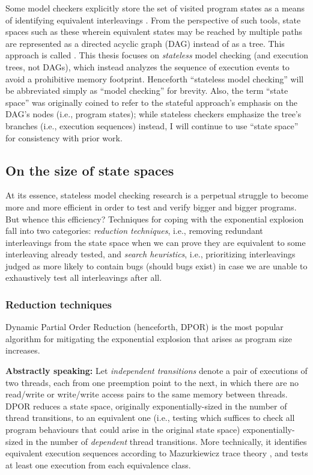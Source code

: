 Some model checkers explicitly store the set of visited program states as a means of identifying equivalent interleavings \cite{spin}.
From the perspective of such tools, state spaces such as these wherein equivalent states may be reached by multiple paths
are represented as a directed acyclic graph (DAG) instead of as a tree.
This approach is called .
This thesis focuses on {\em stateless} model checking (and execution trees, not DAGs),
which instead analyzes the sequence of execution events to avoid a prohibitive memory footprint.
Henceforth ``stateless model checking'' will be abbreviated simply as ``model checking'' for brevity.
Also, the term ``state space'' was originally coined to refer to the stateful approach's emphasis on the DAG's nodes
(i.e., program states);
while stateless checkers emphasize the tree's branches (i.e., execution sequences) instead,
I will continue to use ``state space'' for consistency with prior work.

\subsection{On the size of state spaces}

At its essence, stateless model checking research is a perpetual struggle to become more and more efficient in order to test and verify bigger and bigger programs.
But whence this efficiency?
Techniques for coping with the exponential explosion fall into two categories:
{\em reduction techniques},
i.e.,
removing redundant interleavings from the state space when we can prove they are equivalent to some interleaving already tested,
and
{\em search heuristics},
i.e.,
prioritizing interleavings judged as more likely to contain bugs (should bugs exist)
in case we are unable to exhaustively test all interleavings after all.

\subsubsection{Reduction techniques}

Dynamic Partial Order Reduction \cite{dpor} (henceforth, DPOR) is the most popular algorithm for mitigating the exponential explosion that arises as program size increases.

{\bf Abstractly speaking:}
Let {\em independent transitions} denote a pair of executions of two threads, each from one preemption point to the next,
in which there are no read/write or write/write access pairs to the same memory between threads.
DPOR reduces a state space, originally exponentially-sized in the number of thread transitions,
to an equivalent one
(i.e., testing which suffices to check all program behaviours that could arise in the original state space)
exponentially-sized in the number of {\em dependent} thread transitions.
More technically, it identifies equivalent execution sequences according to Mazurkiewicz trace theory \cite{mazurkiewicz},
and tests at least one execution from each equivalence class.

